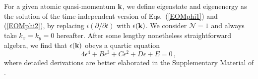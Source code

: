 \documentclass[atoms,article,submit,moreauthors,pdftex,12pt,a4paper]{mdpi}
\begin{document}
For a given atomic quasi-momentum ${\bf k}$, we define eigenstate and eigenenergy as the solution of the time-independent version of Eqs.~(\ref{EOMphi1}) and (\ref{EOMphi2}),  by replacing $i(\partial/\partial t)$ with $\epsilon({\bf k})$. We consider $\mathcal{N}=1$ and always take $k_x =k_y=0$ hereafter. After some lengthy nonetheless straightforward algebra, we find that $\epsilon({\bf k})$ obeys a quartic equation
\begin{equation}
4\epsilon^4+B\epsilon^3+C\epsilon^2+D\epsilon+E=0 \,,
\label{generalquarticEq}
\end{equation}
where detailed derivations are better elaborated in the Supplementary Material of \cite{cavitySOC}. 
\end{document}
